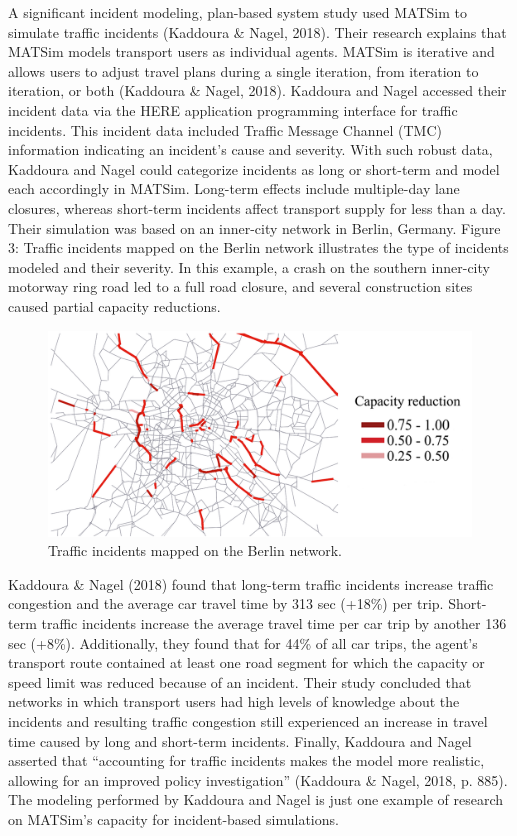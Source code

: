 \documentclass[fancy, oneside, mastersfancy, ms]{byuthesis}
\begin{document}
A significant incident modeling, plan-based system study used MATSim to
simulate traffic incidents (Kaddoura \& Nagel, 2018). Their research
explains that MATSim models transport users as individual agents. MATSim
is iterative and allows users to adjust travel plans during a single
iteration, from iteration to iteration, or both (Kaddoura \& Nagel,
2018). Kaddoura and Nagel accessed their incident data via the HERE
application programming interface for traffic incidents. This incident
data included Traffic Message Channel (TMC) information indicating an
incident's cause and severity. With such robust data, Kaddoura and Nagel
could categorize incidents as long or short-term and model each
accordingly in MATSim. Long-term effects include multiple-day lane
closures, whereas short-term incidents affect transport supply for less
than a day. Their simulation was based on an inner-city network in
Berlin, Germany. Figure 3: Traffic incidents mapped on the Berlin
network illustrates the type of incidents modeled and their severity. In
this example, a crash on the southern inner-city motorway ring road led
to a full road closure, and several construction sites caused partial
capacity reductions.

\begin{figure}

{\centering \includegraphics{figures/berlin_capacity.png}

}

\caption{Traffic incidents mapped on the Berlin network.}

\end{figure}

Kaddoura \& Nagel (2018) found that long-term traffic incidents increase
traffic congestion and the average car travel time by 313 sec (+18\%)
per trip. Short-term traffic incidents increase the average travel time
per car trip by another 136 sec (+8\%). Additionally, they found that
for 44\% of all car trips, the agent's transport route contained at
least one road segment for which the capacity or speed limit was reduced
because of an incident. Their study concluded that networks in which
transport users had high levels of knowledge about the incidents and
resulting traffic congestion still experienced an increase in travel
time caused by long and short-term incidents. Finally, Kaddoura and
Nagel asserted that ``accounting for traffic incidents makes the model
more realistic, allowing for an improved policy investigation''
(Kaddoura \& Nagel, 2018, p. 885). The modeling performed by Kaddoura
and Nagel is just one example of research on MATSim's capacity for
incident-based simulations.
\end{document}
